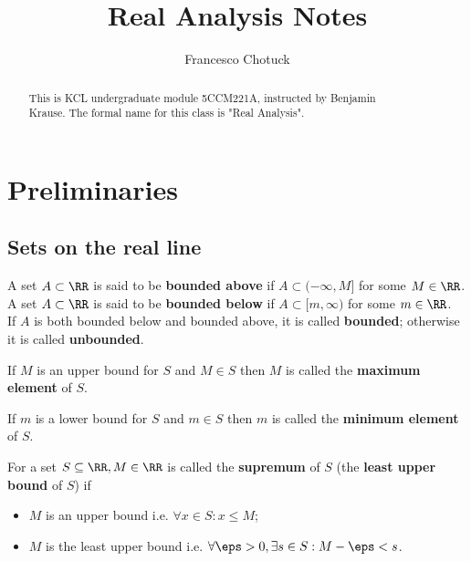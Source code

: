 \documentclass[12pt, a4paper]{article}
\title{Real Analysis Notes}
\date{}
\author{Francesco Chotuck}
\begin{document}
\maketitle

\begin{abstract}
    This is KCL undergraduate module 5CCM221A, instructed by Benjamin \\ Krause. The formal name for this class is "Real Analysis". 
\end{abstract}

\tableofcontents

\pagebreak

\section{Preliminaries}

\subsection{Sets on the real line}

\begin{definition}
    A set \(A \subset \RR\) is said to be \textbf{bounded above} if \(A \subset (-\infty, M]\) for some \(M \in \RR\). \\
    A set \(A \subset \RR\) is said to be \textbf{bounded below} if \(A \subset [m, \infty)\) for some \(m \in \RR\). \\
    If \(A\) is both bounded below and bounded above, it is called \textbf{bounded}; otherwise it is called \textbf{unbounded}.
\end{definition}

\begin{definition}
    If \(M\) is an upper bound for \(S\) and \(M \in S\) then \(M\) is called the \textbf{maximum element} of \(S\).
\end{definition}

\begin{definition}
    If \(m\) is a lower bound for \(S\) and \(m \in S\) then \(m\) is called the \textbf{minimum element} of \(S\).
\end{definition}

\begin{definition}
    For a set \(S \subseteq \RR, M \in \RR\) is called the \textbf{supremum} of \(S\) (the \textbf{least upper bound} of \(S\)) if 
    \begin{itemize}
        \item \(M\) is an upper bound i.e. \(\forall x \in S: x\leq M\);
        \item \(M\) is the least upper bound i.e. \(\forall \eps>0, \exists s\in S : M-\eps <s\).
    \end{itemize}
\end{definition}
\end{document}
